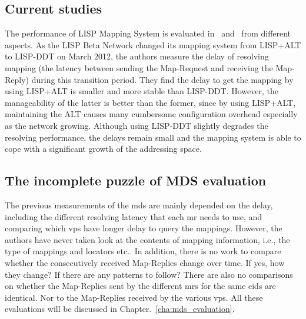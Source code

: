 \subsection{Current studies}
\label{subsec:mds_studies}
The performance of LISP Mapping System is evaluated in~\cite{lispCCR} and~\cite{coras2014performance} from different aspects. As the LISP Beta Network changed its mapping system from LISP+ALT to LISP-DDT on March  2012, the authors measure the delay of resolving mapping (the latency between sending the Map-Request and receiving the Map-Reply) during this transition period. They find the delay to get the mapping by using LISP+ALT is smaller and more stable than LISP-DDT. However, the manageability of the latter is better than the former, since by using LISP+ALT, %
maintaining the ALT causes many cumbersome configuration overhead especially as the network growing. Although using LISP-DDT slightly degrades the resolving performance, the delays remain small and the mapping system is able to cope with a significant growth of the addressing space. %

\subsection{The incomplete puzzle of MDS evaluation}
\label{subsec:mds_missing}
The previous measurements of the \acrshort{mds} are mainly depended on the delay, including the different resolving latency that each \acrshort{mr} needs to use, and comparing which \acrshort{vp}s have longer delay to query the mappings. However, the authors have never taken look at the contents of mapping information, i.e., the type of mappings and locators etc.. In addition, there is no work to compare whether the consecutively received Map-Replies change over time. If yes, how they change? If there are any patterns to follow? There are also no comparisons on whether the Map-Replies sent by the different \acrshort{mr}s for the same \acrshort{eid}s are identical. Nor to the Map-Replies received by the various \acrshort{vp}s. All these evaluations will be discussed in Chapter.~\ref{cha:mds_evaluation}.



